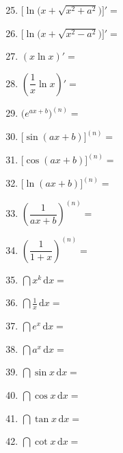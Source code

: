 \documentclass[a4paper,12pt]{article}
\begin{document}
    \begin{minipage}[t]{0.30\textwidth}
        \begin{enumerate}[leftmargin=*, itemsep=1.1em]
            \setcounter{enumi}{24}
            \item $\bigl[\ln\bigl(x+\sqrt{x^2+a^2}\bigr)\bigr]' =$
            \item $\bigl[\ln\bigl(x+\sqrt{x^2-a^2}\bigr)\bigr]' =$
            \item $(x\ln x)' =$
            \item $(\dfrac{1}{x} \ln x)' =$
            \item $\bigl(e^{ax+b}\bigr)^{(n)} =$
            \item $\bigl[\sin(ax+b)\bigr]^{(n)} =$
            \item $\bigl[\cos(ax+b)\bigr]^{(n)} =$
            \item $\bigl[\ln(ax+b)\bigr]^{(n)} =$
            \item $\left(\dfrac{1}{ax+b}\right)^{(n)} =$
            \item $\left(\dfrac{1}{1 + x}\right)^{(n)} =$
            \item $\dint x^k\,\mathrm{d}x =$
            \item $\dint \displaystyle\frac{1}{x}\,\mathrm{d}x =$
            \item $\dint e^x\,\mathrm{d}x =$
            \item $\dint a^x\,\mathrm{d}x =$
            \item $\dint \sin x\,\mathrm{d}x =$
            \item $\dint \cos x\,\mathrm{d}x =$
            \item $\dint \tan x\,\mathrm{d}x =$
            \item $\dint \cot x\,\mathrm{d}x =$
        \end{enumerate}
    \end{minipage}
    \hfill
\end{document}
